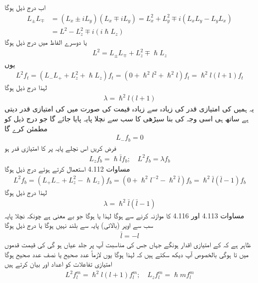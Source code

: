 اب درج ذیل ہوگا 
\begin{align*} 
L_{\pm} L_{\mp}&= (L_x \pm i L_y) (L_x \mp i L_y) = L_x^2 + L_y^2 \mp i (L_x L_y - L_y L_x) \\
&= L^2 - L_z^2 \mp i (i \hslash L_z)
\end{align*}
یا دوسرے الفاظ میں درج ذیل ہوگا 
\begin{align}
L^2 = L_{\pm} L_{\mp} + L_z^2 \mp \hslash L_z
\end{align}
یوں 
\begin{align*}
L^2 f_t = (L_{-} L_{+} + L_z^2 + \hslash L_z) f_t = (0 + \hslash^2 l^2 + \hslash^2 l) f_t = \hslash^2 l (l + 1) f_t
\end{align*}
لہذا درج ذیل ہوگا 
\begin{align}
\lambda = \hslash^2 l (l + 1)
\end{align}
یہ ہمیں  کی امتیازی قدر کی زیادہ سے زیادہ قیمت کی صورت میں  کی امتیازی قدر دیتی ہے ساتھ ہی اسی وجہ کی بنا سیڑھی کا سب سے نچلا پایہ  پایا جائے گا جو درج ذیل کو مطمئن کرے گا 
\begin{align}
L_{-} f_b = 0
\end{align}
فرض کریں اس نچلے پایہ پر  کا امتیازی قدر  ہو 
\begin{align}
L_z f_b = \hslash \bar{l} f_b ; \quad L^2 f_b = \lambda f_b
\end{align}
مساوات 4.112 استعمال کرتے ہوئے درج ذیل ہوگا 
\begin{align*}
L^2 f_b = (L_{+} L_{-} + L_z^2 - \hslash L_z ) f_b = (0 + \hslash^2 l^{-2} - \hslash^2 \bar{l}) f_b = \hslash^2 \bar{l} (\bar{l} - 1) f_b
\end{align*}
لہذا درج ذیل ہوگا 
\begin{align}
\lambda = \hslash^2 \bar{l} (\bar{l} - 1)
\end{align}
مساوات 4.113 اور 4.116 کا موازنہ کرنے سے  ہوگا لہذا یا  ہوگا جو بے معنی ہے چونکہ نچلا پایہ سب سے اوپر  (بالائی)  پایہ سے  بلند نہیں ہوگا یا درج ذیل ہوگا 
\begin{align}
\bar{l} = - l
\end{align}
ظاہر ہے کہ  کے امتیازی اقدار  ہونگے جہاں  جس کی مناسبت آپ پر جلد عیاں ہو گی کی قیمت  قدموں میں  تا  ہوگی بالخصوص آپ دیکھ سکتے ہیں کہ  لہذا  ہوگا یوں   لازماً عدد صحیح یا نصف عدد صحیح ہوگا امتیازی تفاعلات کو اعداد  اور  بیان کرتے ہیں 
\begin{align}
L^2 f_l^m = \hslash^2 l (l + 1) f_l^m ; \quad L_z f_l^m = \hslash m f_l^m
\end{align}
